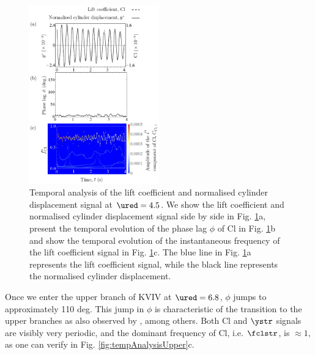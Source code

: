 \documentclass[a4paper,fleqn]{cas-sc}
\begin{document}
\begin{figure}
  \centering
  \includegraphics[width=0.5\textwidth]{figs/figure12}
  \caption{Temporal analysis of the lift coefficient and normalised cylinder displacement signal at $\ured = 4.5$. We show the lift coefficient and normalised cylinder displacement signal side by side in Fig. \ref{fig:tempAnalysisKVIV}a, present the temporal evolution of the phase lag $\phi$ of Cl in Fig. \ref{fig:tempAnalysisKVIV}b and show the temporal evolution of the instantaneous frequency of the lift coefficient signal in Fig. \ref{fig:tempAnalysisKVIV}c. The blue line in Fig. \ref{fig:tempAnalysisKVIV}a represents the lift coefficient signal, while the black line represents the normalised cylinder displacement.} \label{fig:tempAnalysisKVIV}
\end{figure}

Once we enter the upper branch of KVIV at  $\ured = 6.8$, $\phi$ jumps to approximately 110 deg. This jump in $\phi$ is characteristic of the transition to the upper branches as also observed by \citet{Maruai2018}, among others. Both Cl and $\ystr$ signals are visibly very periodic, and the dominant frequency of Cl, i.e. $\fclstr$, is $\approx 1$, as one can verify in Fig. \ref{fig:tempAnalysisUpper}c.
\end{document}
